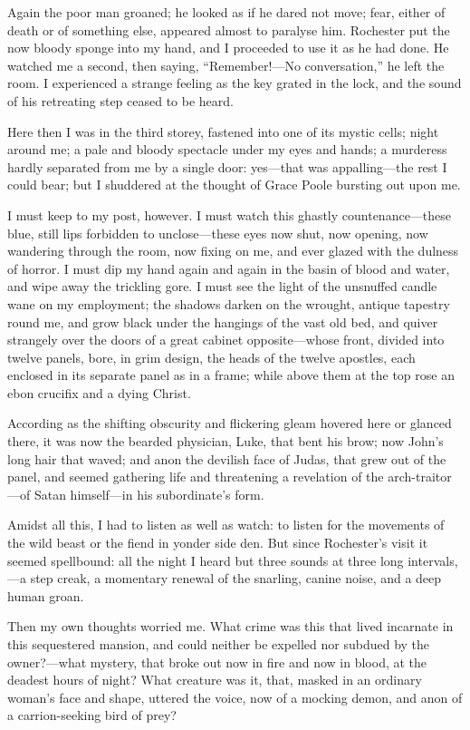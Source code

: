 Again the poor man groaned; he looked as if he dared not move; fear,
either of death or of something else, appeared almost to paralyse him.
\Mr{} Rochester put the now bloody sponge into my hand, and I proceeded to
use it as he had done. He watched me a second, then saying,
\enquote{Remember!---No conversation,} he left the room. I experienced
a strange feeling as the key grated in the lock, and the sound of his
retreating step ceased to be heard.

Here then I was in the third storey, fastened into one of its mystic
cells; night around me; a pale and bloody spectacle under my eyes and
hands; a murderess hardly separated from me by a single door: yes---that
was appalling---the rest I could bear; but I shuddered at the thought of
Grace Poole bursting out upon me.

I must keep to my post, however. I must watch this ghastly
countenance---these blue, still lips forbidden to unclose---these eyes
now shut, now opening, now wandering through the room, now fixing on me,
and ever glazed with the dulness of horror. I must dip my hand again
and again in the basin of blood and water, and wipe away the trickling
gore. I must see the light of the unsnuffed candle wane on my
employment; the shadows darken on the wrought, antique tapestry round
me, and grow black under the hangings of the vast old bed, and quiver
strangely over the doors of a great cabinet opposite---whose front,
divided into twelve panels, bore, in grim design, the heads of the
twelve apostles, each enclosed in its separate panel as in a frame;
while above them at the top rose an ebon crucifix and a dying Christ.

According as the shifting obscurity and flickering gleam hovered here or
glanced there, it was now the bearded physician, Luke, that bent his
brow; now \St{} John's long hair that waved; and anon the devilish face of
Judas, that grew out of the panel, and seemed gathering life and
threatening a revelation of the arch-traitor---of Satan himself---in his
subordinate's form.

Amidst all this, I had to listen as well as watch: to listen for the
movements of the wild beast or the fiend in yonder side den. But since
\Mr{} Rochester's visit it seemed spellbound: all the night I heard but
three sounds at three long intervals,---a step creak, a momentary
renewal of the snarling, canine noise, and a deep human groan.

Then my own thoughts worried me. What crime was this that lived
incarnate in this sequestered mansion, and could neither be expelled nor
subdued by the owner?---what mystery, that broke out now in fire and now
in blood, at the deadest hours of night? What creature was it, that,
masked in an ordinary woman's face and shape, uttered the voice, now of
a mocking demon, and anon of a carrion-seeking bird of prey?

